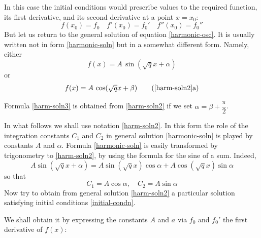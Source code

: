 \athr In this case the initial conditions would prescribe values to the required function, its first derivative, and its second derivative at a point $x = x_{0}$:
\begin{equation*}%
f(x_{0})= f_{0} \quad f'(x_{0})= f_{0}' \quad f''(x_{0})= f_{0}'' 
\end{equation*}
But let us return to the general solution of equation \eqref{harmonic-osc}. It is usually written not in form \eqref{harmonic-soln} but in a somewhat different form. Namely, either
\begin{equation}%
f(x)= A \, \sin (\sqrt{q} x + \alpha)
 \label{harm-soln2}
\end{equation}
or
\begin{equation}%
f(x)= A \, \cos (\sqrt{q} x + \beta)
\tag{\ref{harm-soln2}a}
\label{harm-soln3}
\end{equation}

Formula \eqref{harm-soln3} is obtained from \eqref{harm-soln2} if we set $\alpha = \beta + \dfrac{\pi}{2}$.

In what follows we shall use notation \eqref{harm-soln2}. In this form the role of the integration constants $C_{1}$ and $C_{2}$ in general solution \eqref{harmonic-soln} is played by constants $A$ and $\alpha$. Formula \eqref{harmonic-soln} is easily transformed by trigonometry to \eqref{harm-soln2}, by using the formula for the sine of a sum. Indeed,
 \begin{equation*}%
A \sin (\sqrt{q}x + \alpha) = A \sin (\sqrt{q}x) \cos \alpha + A \cos (\sqrt{q}x) \sin \alpha
\end{equation*}
so that
 \begin{equation*}%
C_{1} = A \cos \alpha,	\quad C_{2} = A \sin \alpha 
\end{equation*}
Now try to obtain from general solution \eqref{harm-soln2} a particular solution satisfying initial conditions \eqref{initial-condn}.

\rdr We shall obtain it by expressing the constants
$A$ and $a$ via $f_{0}$ and $f_{0}'$ the first derivative of $f (x)$:

